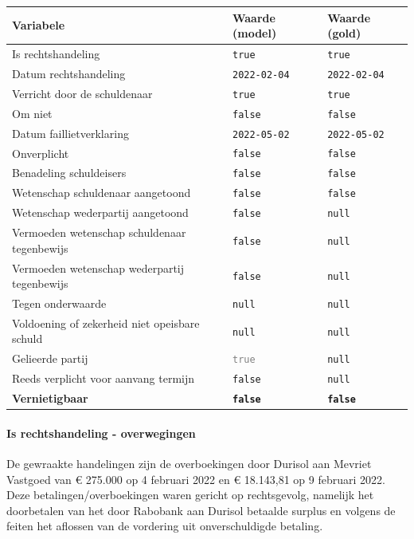 \documentclass[
  dutch,
  a4paper,
]{article}
\begin{document}
\begin{center}
\small
\begin{tabular}{@{}p{7.4cm}p{2.6cm}p{2.6cm}@{}}
\toprule
Variabele & Waarde (model) & Waarde (gold) \\
\midrule
Is rechtshandeling & \texttt{true} & \texttt{true} \\
Datum rechtshandeling & \texttt{2022-02-04} & \texttt{2022-02-04} \\
Verricht door de schuldenaar & \texttt{true} & \texttt{true} \\
Om niet & \texttt{false} & \texttt{false} \\
Datum faillietverklaring & \texttt{2022-05-02} & \texttt{2022-05-02} \\
Onverplicht & \texttt{false} & \texttt{false} \\
Benadeling schuldeisers & \texttt{false} & \texttt{false} \\
Wetenschap schuldenaar aangetoond & \texttt{false} & \texttt{false} \\
Wetenschap wederpartij aangetoond & \texttt{false} & \texttt{null} \\
Vermoeden wetenschap schuldenaar tegenbewijs & \texttt{false} & \texttt{null} \\
Vermoeden wetenschap wederpartij tegenbewijs & \texttt{false} & \texttt{null} \\
Tegen onderwaarde & \texttt{null} & \texttt{null} \\
Voldoening of zekerheid niet opeisbare schuld & \texttt{null} & \texttt{null} \\
Gelieerde partij & \textcolor{gray}{\texttt{true}} & \texttt{null} \\
Reeds verplicht voor aanvang termijn & \texttt{false} & \texttt{null} \\
\textbf{Vernietigbaar} & \textbf{\texttt{false}} & \textbf{\texttt{false}} \\
\bottomrule
\end{tabular}
\end{center}

\paragraph{Is rechtshandeling - overwegingen}\label{is-rechtshandeling---overwegingen-16}

De gewraakte handelingen zijn de overboekingen door Durisol aan Mevriet Vastgoed van € 275.000 op 4 februari 2022 en € 18.143,81 op 9 februari 2022. Deze betalingen/overboekingen waren gericht op rechtsgevolg, namelijk het doorbetalen van het door Rabobank aan Durisol betaalde surplus en volgens de feiten het aflossen van de vordering uit onverschuldigde betaling.
\end{document}
